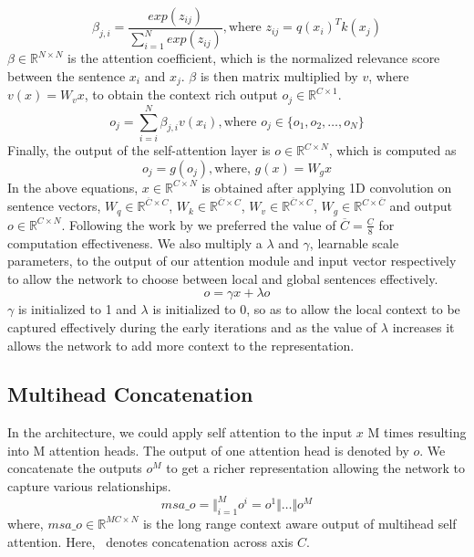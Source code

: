 \documentclass[11pt,a4paper]{article}
\begin{document}
\begin{equation}
    \beta_{j,i} = \frac{exp(z_{ij})}{\sum_{i=1}^{N} exp(z_{ij})}, \text{where } z_{ij} = q(x_{i})^{T}k(x_{j})
    \label{eq:self_attention}
\end{equation}
$\beta \in \mathbb{R}^{N\times{N}}$ is the attention coefficient, which is the normalized relevance score between the sentence $x_{i}$ and $x_{j}$. $\beta$ is then matrix multiplied by $v$, where $v(x) = W_{v}x$, to obtain the context rich output $o_j \in \mathbb{R}^{C \times 1}$. 
\begin{equation}
    o_{j} = \sum_{i=i}^{N} \beta_{j,i}v(x_{i}), \text{where } o_{j} \in \{o_{1}, o_{2}, \dots, o_{N}\}
    \label{eq:context_vector}
\end{equation}
Finally, the output of the self-attention layer is $o \in \mathbb{R}^{C \times N}$, which is computed as
\begin{equation}
    o_j = g(o_j), \text{where, } g(x) = W_{g}x
    \label{eq:output}
\end{equation}
In the above equations, $x \in \mathbb{R}^{C \times N}$ is obtained after applying 1D convolution on sentence vectors, $W_q \in \mathbb{R}^{\overline{C} \times C}$, $W_k \in \mathbb{R}^{\overline{C} \times C}$, $W_v \in \mathbb{R}^{\overline{C} \times C}$, $W_g \in \mathbb{R}^{C \times \overline{C}}$ and output $o \in \mathbb{R}^{C \times N}$. Following the work by \cite{zhang2018selfattention} we preferred the value of $\overline{C}=\frac{C}{8}$ for computation effectiveness. 
We also multiply a $\lambda$ and $\gamma$, learnable scale parameters, to the output of our attention module and input vector respectively to allow the network to choose between local and global sentences effectively.
\begin{equation}
    o = \gamma x + \lambda o
    \label{eq:output_scale}
\end{equation}
$\gamma$ is initialized to 1 and $\lambda$ is initialized to 0, so as to allow the local context to be captured effectively during the early iterations and as the value of $\lambda$ increases it allows the network to add more context to the representation.
\subsection{Multihead Concatenation}
In the architecture, we could apply self attention to the input $x$ M times resulting into M attention heads. The output of one attention head is denoted by $o$. We concatenate the outputs $o^{M}$ to get a richer representation allowing the network to capture various relationships.
\begin{equation}
    msa\_o = \big\Vert_{i=1}^M o^i = o^1 \Vert \dots \Vert o^M
    \label{eq:concat_attention}
\end{equation}
where, $msa\_o \in \mathbb{R}^{MC \times N}$ is the long range context aware output of multihead self attention. Here, \big\Vert \ denotes concatenation across axis $C$.
\end{document}
